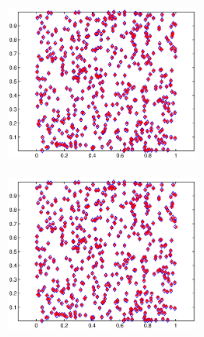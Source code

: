 \documentclass[a0paper,portrait]{baposter}
\begin{document}
\begin{poster}
{\begin{minipage}{75mm}
\includegraphics[width=75mm,height=40mm]{r3.eps}
\end{minipage}
\begin{minipage}{75mm}
\includegraphics[width=75mm,height=40mm]{r4.eps}
\end{minipage}
}

\end{poster}
\end{document}
